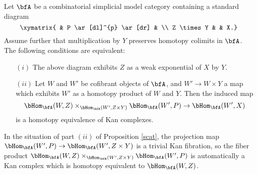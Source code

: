 

\begin{proposition}\label{scat}
Let $\bfA$ be a combinatorial simplicial model category
containing a standard diagram
$$ \xymatrix{ & P \ar[dl]^{p} \ar[dr] & \\
Z \times Y & & X.}$$
Assume further that multiplication by $Y$ preserves homotopy colimits in $\bfA$.
The following conditions are equivalent:
\begin{itemize}
\item[$(i)$] The above diagram exhibits $Z$ as a weak exponential of 
$X$ by $Y$.

\item[$(ii)$] Let $W$ and $W'$ be cofibrant objects of $\bfA$, and
$W' \rightarrow W \times Y$ a map which exhibits $W'$ as a homotopy product
of $W$ and $Y$. Then the induced map
$$\bHom_{\bfA}(W,Z) \times_{ \bHom_{\bfA}( W', Z \times Y) } \bHom_{\bfA}(W', P)
\rightarrow \bHom_{\bfA}(W', X)$$
is a homotopy equivalence of Kan complexes.
\end{itemize}
\end{proposition}

\begin{remark}\label{kilpot}
In the situation of part $(ii)$ of Proposition \ref{scat}, the projection map
$\bHom_{\bfA}( W', P) \rightarrow \bHom_{\bfA}( W', Z \times Y)$ is a trivial Kan fibration, so
the fiber product
$\bHom_{\bfA}(W,Z) \times_{ \bHom_{\bfA}( W', Z \times Y) } \bHom_{\bfA}(W', P)$ is automatically
a Kan complex which is homotopy equivalent to $\bHom_{\bfA}(W,Z)$.
\end{remark}

